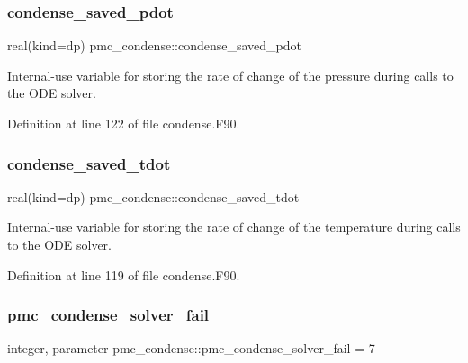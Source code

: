 \subsubsection{\texorpdfstring{condense\+\_\+saved\+\_\+pdot}{condense\_saved\_pdot}}
{\footnotesize\ttfamily real(kind=dp) pmc\+\_\+condense\+::condense\+\_\+saved\+\_\+pdot}



Internal-\/use variable for storing the rate of change of the pressure during calls to the O\+DE solver. 



Definition at line 122 of file condense.\+F90.

\mbox{\label{namespacepmc__condense_a0a1155d88faa2b061fd371090165aad1}} 
\subsubsection{\texorpdfstring{condense\+\_\+saved\+\_\+tdot}{condense\_saved\_tdot}}
{\footnotesize\ttfamily real(kind=dp) pmc\+\_\+condense\+::condense\+\_\+saved\+\_\+tdot}



Internal-\/use variable for storing the rate of change of the temperature during calls to the O\+DE solver. 



Definition at line 119 of file condense.\+F90.

\mbox{\label{namespacepmc__condense_a72475de47c696e1ac0386f8f0881dba3}} 
\subsubsection{\texorpdfstring{pmc\+\_\+condense\+\_\+solver\+\_\+fail}{pmc\_condense\_solver\_fail}}
{\footnotesize\ttfamily integer, parameter pmc\+\_\+condense\+::pmc\+\_\+condense\+\_\+solver\+\_\+fail = 7}



